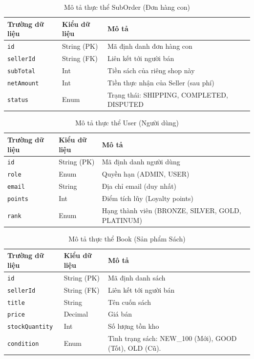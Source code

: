 \documentclass[../main.tex]{subfiles}
\begin{document}
\begin{table}[H]
\centering
\caption{Mô tả thực thể SubOrder (Đơn hàng con)}
\begin{tabular}{|l|l|l|}
\hline
\textbf{Trường dữ liệu} & \textbf{Kiểu dữ liệu} & \textbf{Mô tả} \\ \hline
\texttt{id} & String (PK) & Mã định danh đơn hàng con \\ \hline
\texttt{sellerId} & String (FK) & Liên kết tới người bán \\ \hline
\texttt{subTotal} & Int & Tiền sách của riêng shop này \\ \hline
\texttt{netAmount} & Int & Tiền thực nhận của Seller (sau phí) \\ \hline
\texttt{status} & Enum & Trạng thái: SHIPPING, COMPLETED, DISPUTED \\ \hline
\end{tabular}
\end{table}

\begin{table}[H]
\centering
\caption{Mô tả thực thể User (Người dùng)}
\begin{tabular}{|l|l|p{8cm}|}
\hline
\textbf{Trường dữ liệu} & \textbf{Kiểu dữ liệu} & \textbf{Mô tả} \\ \hline
\texttt{id} & String (PK) & Mã định danh người dùng \\ \hline
\texttt{role} & Enum & Quyền hạn (ADMIN, USER) \\ \hline
\texttt{email} & String & Địa chỉ email (duy nhất) \\ \hline
\texttt{points} & Int & Điểm tích lũy (Loyalty points) \\ \hline
\texttt{rank} & Enum & Hạng thành viên (BRONZE, SILVER, GOLD, PLATINUM) \\ \hline
\end{tabular}
\end{table}

\begin{table}[H]
\centering
\caption{Mô tả thực thể Book (Sản phẩm Sách)}
\begin{tabular}{|l|l|p{8cm}|}
\hline
\textbf{Trường dữ liệu} & \textbf{Kiểu dữ liệu} & \textbf{Mô tả} \\ \hline
\texttt{id} & String (PK) & Mã định danh sách \\ \hline
\texttt{sellerId} & String (FK) & Liên kết tới người bán \\ \hline
\texttt{title} & String & Tên cuốn sách \\ \hline
\texttt{price} & Decimal & Giá bán \\ \hline
\texttt{stockQuantity} & Int & Số lượng tồn kho \\ \hline
\texttt{condition} & Enum & Tình trạng sách: NEW\_100 (Mới), GOOD (Tốt), OLD (Cũ). \\ \hline
\end{tabular}
\end{table}
\end{document}

